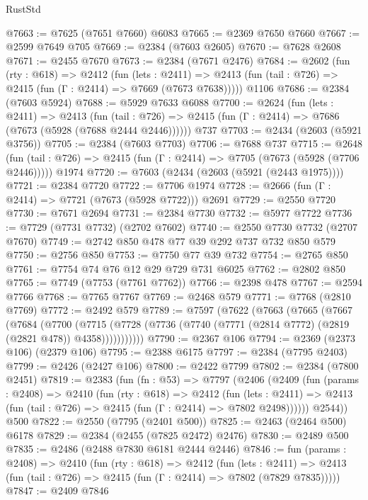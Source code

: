 \begin{lexlean}{RustStd}
\begin{coremodule}
@7663 := @7625 (@7651 @7660) @6083
@7665 := @2369 @7650 @7660
@7667 := @2599 @7649 @705
@7669 := @2384 (@7603 @2605)
@7670 := @7628 @2608
@7671 := @2455 @7670
@7673 := @2384 (@7671 @2476)
@7684 := @2602
    (fun (rty : @618) =>
    @2412
      (fun (lets : @2411) =>
      @2413 (fun (tail : @726) => @2415 (fun (Γ : @2414) => @7669 (@7673 @7638)))))
    @1106
@7686 := @2384 (@7603 @5924)
@7688 := @5929 @7633 @6088
@7700 := @2624
    (fun (lets : @2411) =>
    @2413
      (fun (tail : @726) => @2415 (fun (Γ : @2414) => @7686 (@7673 (@5928 (@7688 @2444 @2446))))))
    @737
@7703 := @2434 (@2603 (@5921 @3756))
@7705 := @2384 (@7603 @7703)
@7706 := @7688 @737
@7715 := @2648
    (fun (tail : @726) => @2415 (fun (Γ : @2414) => @7705 (@7673 (@5928 (@7706 @2446)))))
    @1974
@7720 := @7603 (@2434 (@2603 (@5921 (@2443 @1975))))
@7721 := @2384 @7720
@7722 := @7706 @1974
@7728 := @2666 (fun (Γ : @2414) => @7721 (@7673 (@5928 @7722))) @2691
@7729 := @2550 @7720
@7730 := @7671 @2694
@7731 := @2384 @7730
@7732 := @5977 @7722
@7736 := @7729 (@7731 @7732) (@2702 @7602)
@7740 := @2550 @7730 @7732 (@2707 @7670)
@7749 := @2742 @850 @478 @77 @39 @292 @737 @732 @850 @579
@7750 := @2756 @850
@7753 := @7750 @77 @39 @732
@7754 := @2765 @850
@7761 := @7754 @74 @76 @12 @29 @729 @731 @6025
@7762 := @2802 @850
@7765 := @7749 (@7753 (@7761 @7762))
@7766 := @2398 @478
@7767 := @2594 @7766
@7768 := @7765 @7767
@7769 := @2468 @579
@7771 := @7768 (@2810 @7769)
@7772 := @2492 @579
@7789 := @7597
    (@7622
      (@7663
        (@7665
          (@7667
            (@7684
              (@7700
                (@7715
                  (@7728 (@7736 (@7740 (@7771 (@2814 @7772) (@2819 (@2821 @478)) @4358)))))))))))
@7790 := @2367 @106
@7794 := @2369 (@2373 @106) (@2379 @106)
@7795 := @2388 @6175
@7797 := @2384 (@7795 @2403)
@7799 := @2426 (@2427 @106)
@7800 := @2422 @7799
@7802 := @2384 (@7800 @2451)
@7819 := @2383
    (fun (fn : @53) =>
    @7797
      (@2406
        (@2409
          (fun (params : @2408) =>
          @2410
            (fun (rty : @618) =>
            @2412
              (fun (lets : @2411) =>
              @2413 (fun (tail : @726) => @2415 (fun (Γ : @2414) => @7802 @2498))))))
        @2544))
    @500
@7822 := @2550 (@7795 (@2401 @500))
@7825 := @2463 (@2464 @500) @6178
@7829 := @2384 (@2455 (@7825 @2472) @2476)
@7830 := @2489 @500
@7835 := @2486 (@2488 @7830 @6181 @2444 @2446)
@7846 := fun (params : @2408) =>
  @2410
    (fun (rty : @618) =>
    @2412
      (fun (lets : @2411) =>
      @2413 (fun (tail : @726) => @2415 (fun (Γ : @2414) => @7802 (@7829 @7835)))))
@7847 := @2409 @7846

\end{coremodule}
\end{lexlean}
